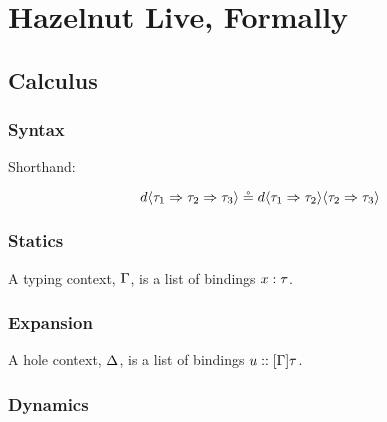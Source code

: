 
\clearpage
\newcommand{\calculusSec}{Hazelnut Live, Formally}
\section{\protect\calculusSec}
\label{sec:calculus}

\subsection{Calculus}

\subsubsection{Syntax}



{\color{gray}\blindtext}

Shorthand:

$$
d \langle{\tau_1}\Rightarrow{\tau_2}\Rightarrow{\tau_3}\rangle \circeq
  d \langle{\tau_1}\Rightarrow{\tau_2}\rangle \langle{\tau_2}\Rightarrow{\tau_3}\rangle
$$


\subsubsection{Statics}




{\color{gray}\blindtext}
{\color{gray}\blindtext}
{\color{gray}\blindtext}

A typing context, $\Gamma$, is a list of bindings $x : \tau$.

\subsubsection{Expansion}




{\color{gray}\blindtext}
{\color{gray}\blindtext}
{\color{gray}\blindtext}

A hole context, $\Delta$, is a list of bindings $u :: [\Gamma]\tau$.

\subsubsection{Dynamics}






